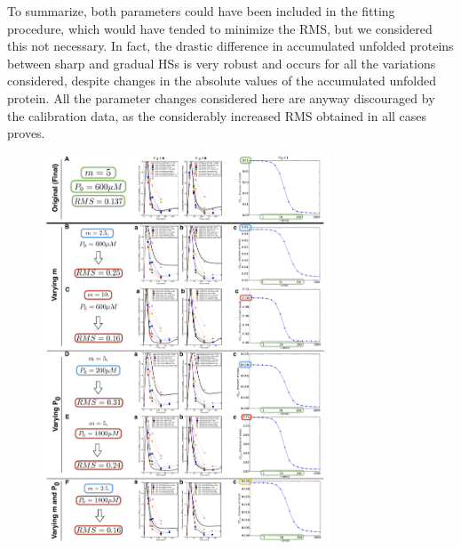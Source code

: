 \documentclass[oneside, 10pt, a4paper, twocolumn]{article}
\begin{document}
{To summarize, both parameters could have been included in the fitting procedure, which would have tended to minimize the RMS, but we considered this not necessary. In fact, the drastic difference in accumulated unfolded proteins between sharp and gradual HSs is very robust and occurs for all the variations considered, despite changes in the absolute values of the accumulated unfolded protein. All the parameter changes considered here are anyway discouraged by the calibration data, as the considerably increased RMS obtained in all cases proves.}



\begin{figure}
\centering
\includegraphics[width=0.77\textwidth]{Figure9_SupMat.pdf}

\end{figure}
\end{document}
